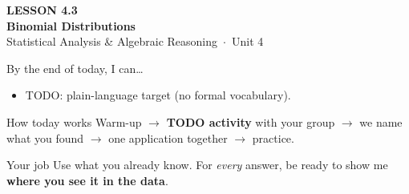\documentclass[aspectratio=169, 11pt]{beamer}
\begin{document}
{
\begin{frame}[plain]
  \vspace{2.8cm}\hspace{0.55cm}%
  \begin{minipage}{0.9\textwidth}
    {\color{goldacc}\bfseries\small LESSON 4.3}\\[0.5cm]
    {\color{white}\bfseries\LARGE Binomial Distributions}\\[1.2cm]
    {\color{frostmid}\small Statistical Analysis \& Algebraic Reasoning~$\cdot$~Unit 4}
  \end{minipage}
\end{frame}
}

\newcommand{\redink}[1]{{\color{redacc}\bfseries #1}}

\begin{frame}[t, plain]
  By the end of today, I can\ldots
  \begin{itemize}\setlength{\itemsep}{6pt}
    \item TODO: plain-language target (no formal vocabulary).
  \end{itemize}
  \begin{block}{How today works}
    Warm-up $\to$ \textbf{TODO activity} with your group $\to$ we name what you found $\to$
    one application together $\to$ practice.
  \end{block}
\end{frame}

\begin{frame}[t, plain]
\end{frame}

\begin{frame}[t, plain]
  \begin{block}{Your job}
    Use what you already know. For \emph{every} answer, be ready to show me
    \textbf{where you see it in the data}.
  \end{block}
\end{frame}
\end{document}
